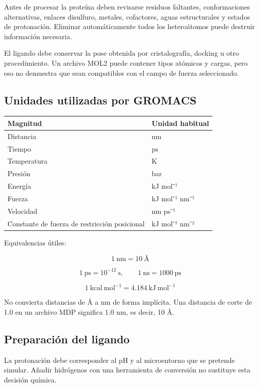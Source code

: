 \documentclass[
  spanish,
  11pt,
  a4paper]{article}
\newcounter{none} %
\begin{document}
Antes de procesar la proteína deben revisarse residuos faltantes,
conformaciones alternativas, enlaces disulfuro, metales, cofactores,
aguas estructurales y estados de protonación. Eliminar automáticamente
todos los heteroátomos puede destruir información necesaria.

El ligando debe conservar la pose obtenida por cristalografía, docking u
otro procedimiento. Un archivo MOL2 puede contener tipos atómicos y
cargas, pero eso no demuestra que sean compatibles con el campo de
fuerza seleccionado.

\subsection{Unidades utilizadas por
GROMACS}\label{unidades-utilizadas-por-gromacs}

{\def\LTcaptype{none} %
\begin{longtable}[]{@{}ll@{}}
\toprule\noalign{}
Magnitud & Unidad habitual \\
\midrule\noalign{}
\endhead
\bottomrule\noalign{}
\endlastfoot
Distancia & nm \\
Tiempo & ps \\
Temperatura & K \\
Presión & bar \\
Energía & kJ mol⁻¹ \\
Fuerza & kJ mol⁻¹ nm⁻¹ \\
Velocidad & nm ps⁻¹ \\
Constante de fuerza de restricción posicional & kJ mol⁻¹ nm⁻² \\
\end{longtable}
}

Equivalencias útiles:

\[
1\ \mathrm{nm}=10\ \text{Å}
\]

\[
1\ \mathrm{ps}=10^{-12}\ \mathrm{s},\qquad
1\ \mathrm{ns}=1000\ \mathrm{ps}
\]

\[
1\ \mathrm{kcal\ mol^{-1}}=4.184\ \mathrm{kJ\ mol^{-1}}
\]

No convierta distancias de Å a nm de forma implícita. Una distancia de
corte de 1.0 en un archivo MDP significa 1.0 nm, es decir, 10 Å.

\subsection{Preparación del ligando}\label{preparaciuxf3n-del-ligando}

La protonación debe corresponder al pH y al microentorno que se pretende
simular. Añadir hidrógenos con una herramienta de conversión no
sustituye esta decisión química.
\end{document}
